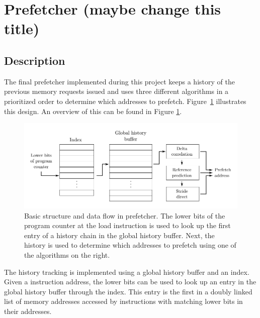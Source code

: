 \section{Prefetcher (maybe change this title)}
\label{sec:prefetcher}
\subsection{Description}

The final prefetcher implemented during this project keeps a history of the
previous memory requests issued and uses three different algorithms in a
prioritized order to determine which addresses to prefetch.
Figure~\ref{fig:prefetcher} illustrates this design.
An overview of this can be found in Figure \ref{fig:prefetcher}.

\begin{figure}[h]
	\includegraphics{images/prefetcher.pdf}
	\caption{
		Basic structure and data flow in prefetcher. The lower bits of the
		program counter at the load instruction is used to look up the first
		entry of a history chain in the global history buffer. Next, the history
		is used to determine which addresses to prefetch using one of the
		algorithms on the right.
	}
	\label{fig:prefetcher}
\end{figure}

The history tracking is implemented using a global history buffer and an index.
Given a instruction address, the lower bits can be used to look up an entry in
the global history buffer through the index.
This entry is the first in a doubly linked list of memory addresses accessed by
instructions with matching lower bits in their addresses.


